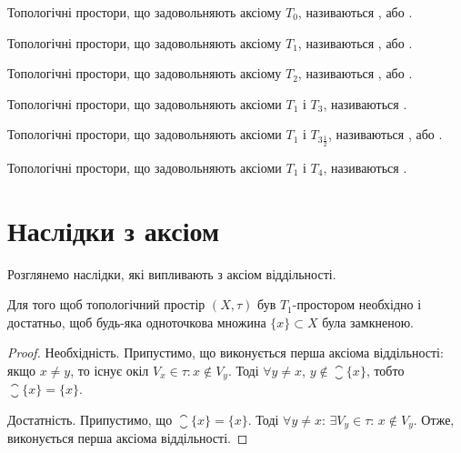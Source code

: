 \begin{definition}[Колмогоров, 1935]
Топологічні простори, що
задовольняють аксіому $T_0$, називаються ,
або .
\end{definition}

\begin{definition}[Рісс, 1907]
Топологічні простори, що
задовольняють аксіому $T_1$, називаються ,
або .
\end{definition}

\begin{definition}[Хаусдорф, 1914]
Топологічні простори, що
задовольняють аксіому $T_2$, називаються ,
або .
\end{definition}

\begin{definition}[В'єторіс, 1921]
Топологічні простори, що
задовольняють аксіоми $T_1$ і $T_3$, називаються .
\end{definition}

\begin{definition}[Тихонов, 1930]
Топологічні простори, що
задовольняють аксіоми $T_1$ і $T_{3\frac{1}{2}}$, називаються , або .
\end{definition}

\begin{definition}
Топологічні простори, що задовольняють аксіоми
$T_1$ і $T_4$, називаються .
\end{definition}

\section{Наслідки з аксіом}

Розглянемо наслідки, які випливають з аксіом
віддільності.

\begin{theorem}
Для того щоб
топологічний простір $(X, \tau)$ був $T_1$-простором необхідно і
достатньо, щоб будь-яка одноточкова множина $\{x\} \subset X$
була замкненою.
\end{theorem}

\begin{proof}
Необхідність. Припустимо, що виконується
перша аксіома віддільності: якщо $x \ne y$, то існує окіл
$V_x \in \tau: x \notin V_y$. Тоді $\forall y \ne x$, $y \notin \closure{\{x\}}$,
тобто $\closure{\{x\}} = \{x\}$.

Достатність. Припустимо, що $\closure{\{x\}} = \{x\}$. Тоді
$\forall y \ne x$: $\exists V_y \in \tau$: $x \notin V_y$. Отже, виконується перша аксіома
віддільності.
\end{proof}

